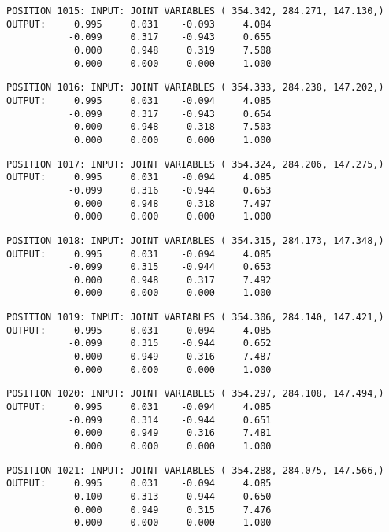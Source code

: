 \begin{verbatim}
POSITION 1015: INPUT: JOINT VARIABLES ( 354.342, 284.271, 147.130,)
OUTPUT:     0.995     0.031    -0.093     4.084
           -0.099     0.317    -0.943     0.655
            0.000     0.948     0.319     7.508
            0.000     0.000     0.000     1.000
\end{verbatim} \pagebreak[1]\begin{verbatim}
POSITION 1016: INPUT: JOINT VARIABLES ( 354.333, 284.238, 147.202,)
OUTPUT:     0.995     0.031    -0.094     4.085
           -0.099     0.317    -0.943     0.654
            0.000     0.948     0.318     7.503
            0.000     0.000     0.000     1.000
\end{verbatim} \pagebreak[1]\begin{verbatim}
POSITION 1017: INPUT: JOINT VARIABLES ( 354.324, 284.206, 147.275,)
OUTPUT:     0.995     0.031    -0.094     4.085
           -0.099     0.316    -0.944     0.653
            0.000     0.948     0.318     7.497
            0.000     0.000     0.000     1.000
\end{verbatim} \pagebreak[1]\begin{verbatim}
POSITION 1018: INPUT: JOINT VARIABLES ( 354.315, 284.173, 147.348,)
OUTPUT:     0.995     0.031    -0.094     4.085
           -0.099     0.315    -0.944     0.653
            0.000     0.948     0.317     7.492
            0.000     0.000     0.000     1.000
\end{verbatim} \pagebreak[1]\begin{verbatim}
POSITION 1019: INPUT: JOINT VARIABLES ( 354.306, 284.140, 147.421,)
OUTPUT:     0.995     0.031    -0.094     4.085
           -0.099     0.315    -0.944     0.652
            0.000     0.949     0.316     7.487
            0.000     0.000     0.000     1.000
\end{verbatim} \pagebreak[1]\begin{verbatim}
POSITION 1020: INPUT: JOINT VARIABLES ( 354.297, 284.108, 147.494,)
OUTPUT:     0.995     0.031    -0.094     4.085
           -0.099     0.314    -0.944     0.651
            0.000     0.949     0.316     7.481
            0.000     0.000     0.000     1.000
\end{verbatim} \pagebreak[1]\begin{verbatim}
POSITION 1021: INPUT: JOINT VARIABLES ( 354.288, 284.075, 147.566,)
OUTPUT:     0.995     0.031    -0.094     4.085
           -0.100     0.313    -0.944     0.650
            0.000     0.949     0.315     7.476
            0.000     0.000     0.000     1.000
\end{verbatim} \pagebreak[1]\begin{verbatim}

\end{verbatim}

